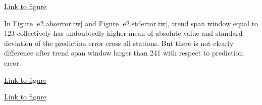 \begin{framed}
\begin{center}
  \href{../plots/a1950/E2/tmax.mean.std.error.sw.pdf}{Link to figure}
  \label{e2.stderror.sw}
\end{center}
\end{framed}

In Figure 
\href{../plots/a1950/E2/tmax.mean.absmeans.error.sw.pdf}{\ref*{e2.abserror.tw}} 
and Figure 
\href{../plots/a1950/E2/tmax.mean.std.error.sw.pdf}{\ref*{e2.stderror.tw}}, trend
span window equal to 123 collectively has undoubtedly higher mean of absolute 
value and standard deviation of the prediction error cross all stations. But there
is not clearly difference after trend span window larger than 241 with respect
to prediction error.

\begin{framed}
\begin{center}
  \href{../plots/a1950/E2/tmax.mean.absmeans.error.tw.pdf}{Link to figure}
  \label{e2.abserror.tw}
\end{center}
\end{framed}

\begin{framed}
\begin{center}
  \href{../plots/a1950/E2/tmax.mean.std.error.tw.pdf}{Link to figure}
  \label{e2.stderror.tw}
\end{center}
\end{framed}

